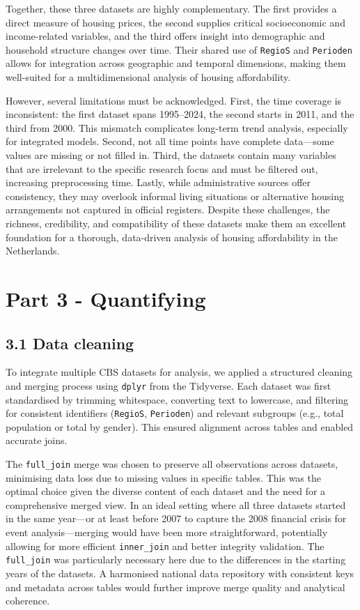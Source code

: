 \documentclass[
]{article}
\begin{document}
Together, these three datasets are highly complementary. The first
provides a direct measure of housing prices, the second supplies
critical socioeconomic and income-related variables, and the third
offers insight into demographic and household structure changes over
time. Their shared use of \texttt{RegioS} and \texttt{Perioden} allows
for integration across geographic and temporal dimensions, making them
well-suited for a multidimensional analysis of housing affordability.

However, several limitations must be acknowledged. First, the time
coverage is inconsistent: the first dataset spans 1995--2024, the second
starts in 2011, and the third from 2000. This mismatch complicates
long-term trend analysis, especially for integrated models. Second, not
all time points have complete data---some values are missing or not
filled in. Third, the datasets contain many variables that are
irrelevant to the specific research focus and must be filtered out,
increasing preprocessing time. Lastly, while administrative sources
offer consistency, they may overlook informal living situations or
alternative housing arrangements not captured in official registers.
Despite these challenges, the richness, credibility, and compatibility
of these datasets make them an excellent foundation for a thorough,
data-driven analysis of housing affordability in the Netherlands.

\section{Part 3 - Quantifying}\label{part-3---quantifying}

\subsection{3.1 Data cleaning}\label{data-cleaning}

To integrate multiple CBS datasets for analysis, we applied a structured
cleaning and merging process using \texttt{dplyr} from the Tidyverse.
Each dataset was first standardised by trimming whitespace, converting
text to lowercase, and filtering for consistent identifiers
(\texttt{RegioS}, \texttt{Perioden}) and relevant subgroups (e.g., total
population or total by gender). This ensured alignment across tables and
enabled accurate joins.

The \texttt{full\_join} merge was chosen to preserve all observations
across datasets, minimising data loss due to missing values in specific
tables. This was the optimal choice given the diverse content of each
dataset and the need for a comprehensive merged view. In an ideal
setting where all three datasets started in the same year---or at least
before 2007 to capture the 2008 financial crisis for event
analysis---merging would have been more straightforward, potentially
allowing for more efficient \texttt{inner\_join} and better integrity
validation. The \texttt{full\_join} was particularly necessary here due
to the differences in the starting years of the datasets. A harmonised
national data repository with consistent keys and metadata across tables
would further improve merge quality and analytical coherence.
\end{document}
